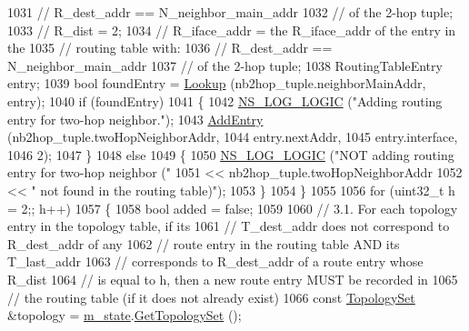 \begin{DoxyCode}
1031       \textcolor{comment}{//                                   R\_dest\_addr == N\_neighbor\_main\_addr}
1032       \textcolor{comment}{//                                                  of the 2-hop tuple;}
1033       \textcolor{comment}{//                R\_dist       = 2;}
1034       \textcolor{comment}{//                R\_iface\_addr = the R\_iface\_addr of the entry in the}
1035       \textcolor{comment}{//                               routing table with:}
1036       \textcolor{comment}{//                                   R\_dest\_addr == N\_neighbor\_main\_addr}
1037       \textcolor{comment}{//                                                  of the 2-hop tuple;}
1038       RoutingTableEntry entry;
1039       \textcolor{keywordtype}{bool} foundEntry = \hyperlink{classns3_1_1olsr_1_1RoutingProtocol_a514bf401454b233af509476fc3fd5d6b}{Lookup} (nb2hop\_tuple.neighborMainAddr, entry);
1040       \textcolor{keywordflow}{if} (foundEntry)
1041         \{
1042           \hyperlink{group__logging_ga88acd260151caf2db9c0fc84997f45ce}{NS\_LOG\_LOGIC} (\textcolor{stringliteral}{"Adding routing entry for two-hop neighbor."});
1043           \hyperlink{classns3_1_1olsr_1_1RoutingProtocol_a6ddb7dd3a6584b7d88dc5a41a61b1494}{AddEntry} (nb2hop\_tuple.twoHopNeighborAddr,
1044                     entry.nextAddr,
1045                     entry.interface,
1046                     2);
1047         \}
1048       \textcolor{keywordflow}{else}
1049         \{
1050           \hyperlink{group__logging_ga88acd260151caf2db9c0fc84997f45ce}{NS\_LOG\_LOGIC} (\textcolor{stringliteral}{"NOT adding routing entry for two-hop neighbor ("}
1051                         << nb2hop\_tuple.twoHopNeighborAddr
1052                         << \textcolor{stringliteral}{" not found in the routing table)"});
1053         \}
1054     \}
1055 
1056   \textcolor{keywordflow}{for} (uint32\_t h = 2;; h++)
1057     \{
1058       \textcolor{keywordtype}{bool} added = \textcolor{keyword}{false};
1059 
1060       \textcolor{comment}{// 3.1. For each topology entry in the topology table, if its}
1061       \textcolor{comment}{// T\_dest\_addr does not correspond to R\_dest\_addr of any}
1062       \textcolor{comment}{// route entry in the routing table AND its T\_last\_addr}
1063       \textcolor{comment}{// corresponds to R\_dest\_addr of a route entry whose R\_dist}
1064       \textcolor{comment}{// is equal to h, then a new route entry MUST be recorded in}
1065       \textcolor{comment}{// the routing table (if it does not already exist)}
1066       \textcolor{keyword}{const} \hyperlink{namespacens3_1_1olsr_aa5a4b5a4c916439ca513b91928d7eba0}{TopologySet} &topology = \hyperlink{classns3_1_1olsr_1_1RoutingProtocol_a07942ec1a7df71b609c8d2ff3b567c49}{m\_state}.\hyperlink{classns3_1_1olsr_1_1OlsrState_a2ca307d08ead8410b13ab05ec073b45a}{GetTopologySet} ();

\end{DoxyCode}

